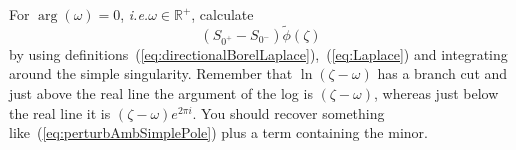 \documentclass{exam}
\begin{document}
\begin{questions}
        For $\arg(\omega) = 0$, \emph{i.e.}\@ $\omega \in \mathbb{R}^+$, calculate
        \begin{equation}
            (S_{0^+} - S_{0^-})\tilde{\phi}(\zeta)
        \end{equation}
        by using definitions~(\ref{eq:directionalBorelLaplace}),~(\ref{eq:Laplace})
        and integrating around the simple singularity.
        Remember that $\ln(\zeta-\omega)$ has a branch cut and just above the real line the argument of the log is $(\zeta - \omega)$,
        whereas just below the real line it is $(\zeta - \omega)e^{2\pi i}$.
        You should recover something like~(\ref{eq:perturbAmbSimplePole}) plus a term containing the minor.

    
\end{questions}
\end{document}
